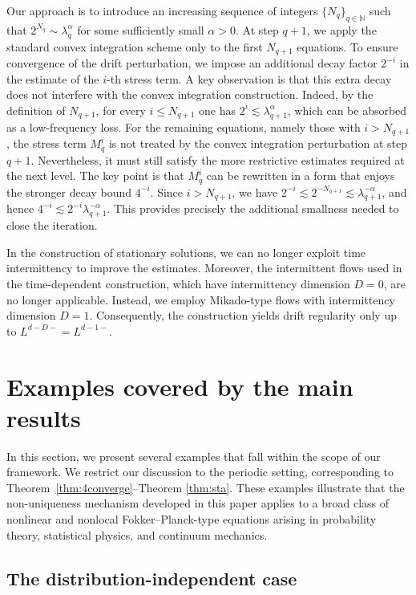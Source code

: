 \documentclass[10pt,a4paper]{amsart}
\numberwithin{equation}{section}
\def\leq{\leqslant}
\def\leq{\leqslant}
\begin{document}
Our approach is to introduce an increasing sequence of integers
$\{N_q\}_{q\in\mathbb{N}}$ such that
$2^{N_q}\sim \lambda_q^\alpha$ for some sufficiently small $\alpha>0$.
At step $q+1$, we apply the standard convex integration scheme only to the first $N_{q+1}$ equations. To ensure convergence
of the drift perturbation, we impose an additional decay factor $2^{-i}$ in
the estimate of the $i$-th stress term. A key observation is that this extra
decay does not interfere with the convex integration construction. Indeed, by
the definition of $N_{q+1}$, for every $i\leq N_{q+1}$ one has
$2^i\lesssim \lambda_{q+1}^{\alpha}$, which can be absorbed
as a low-frequency loss.
For the remaining equations, namely those with $i>N_{q+1}$, the stress term
$M_q^i$ is not treated by the convex integration perturbation at step $q+1$.
Nevertheless, it must still satisfy the more restrictive estimates required at
the next level. The key point is that $M_q^i$ can be rewritten in a form that
enjoys the stronger decay bound $4^{-i}$. Since $i>N_{q+1}$, we have
$2^{-i}\lesssim 2^{-N_{q+1}}\lesssim \lambda_{q+1}^{-\alpha}$, and hence
$
4^{-i}
\lesssim
2^{-i}\lambda_{q+1}^{-\alpha}.
$
This provides precisely the additional smallness needed to close the
iteration.

In the construction of stationary solutions, we can no longer exploit time
intermittency to improve the estimates. Moreover, the intermittent flows used
in the time-dependent construction, which have intermittency dimension $D=0$,
are no longer applicable. Instead, we employ Mikado-type flows with
intermittency dimension $D=1$. Consequently, the construction yields drift
regularity only up to
$
L^{d-D-}=L^{d-1-}.
$

 


\section{Examples covered by the main results}\label{sec:example}

In this section, we present several examples that fall within the scope of our
framework. We restrict our discussion to the periodic setting, corresponding
to Theorem~\ref{thm:4converge}--Theorem \ref{thm:sta}. These examples illustrate
that the non-uniqueness mechanism developed in this paper applies to a broad
class of nonlinear and nonlocal Fokker--Planck-type equations arising in
probability theory, statistical physics, and continuum mechanics.

\subsection{The distribution-independent case}
\end{document}
